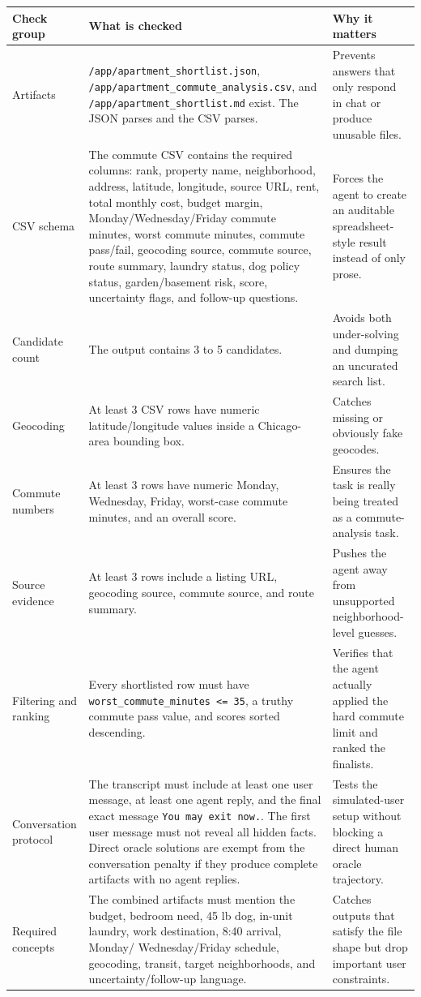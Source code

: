 \documentclass[11pt]{article}
\begin{document}
\begin{center}
\scriptsize
\setlength{\tabcolsep}{4pt}
\begin{tabular}{|>{\raggedright\arraybackslash}p{1.25in}|>{\raggedright\arraybackslash}p{3.1in}|>{\raggedright\arraybackslash}p{1.7in}|}
\hline
Check group & What is checked & Why it matters \\
\hline
Artifacts & \texttt{/app/apartment\_shortlist.json},
\texttt{/app/apartment\_commute\_analysis.csv}, and
\texttt{/app/apartment\_shortlist.md} exist. The JSON parses and the CSV
parses. & Prevents answers that only respond in chat or produce unusable files.
\\
\hline
CSV schema & The commute CSV contains the required columns: rank, property
name, neighborhood, address, latitude, longitude, source URL, rent, total
monthly cost, budget margin, Monday/Wednesday/Friday commute minutes, worst
commute minutes, commute pass/fail, geocoding source, commute source, route
summary, laundry status, dog policy status, garden/basement risk, score,
uncertainty flags, and follow-up questions. & Forces the agent to create an
auditable spreadsheet-style result instead of only prose. \\
\hline
Candidate count & The output contains 3 to 5 candidates. & Avoids both
under-solving and dumping an uncurated search list. \\
\hline
Geocoding & At least 3 CSV rows have numeric latitude/longitude values inside a
Chicago-area bounding box. & Catches missing or obviously fake geocodes. \\
\hline
Commute numbers & At least 3 rows have numeric Monday, Wednesday, Friday,
worst-case commute minutes, and an overall score. & Ensures the task is really
being treated as a commute-analysis task. \\
\hline
Source evidence & At least 3 rows include a listing URL, geocoding source,
commute source, and route summary. & Pushes the agent away from unsupported
neighborhood-level guesses. \\
\hline
Filtering and ranking & Every shortlisted row must have
\texttt{worst\_commute\_minutes <= 35}, a truthy commute pass value, and scores
sorted descending. & Verifies that the agent actually applied the hard commute
limit and ranked the finalists. \\
\hline
Conversation protocol & The transcript must include at least one user message,
at least one agent reply, and the final exact message \texttt{You may exit
now.}. The first user message must not reveal all hidden facts. Direct oracle
solutions are exempt from the conversation penalty if they produce complete
artifacts with no agent replies. & Tests the simulated-user setup without
blocking a direct human oracle trajectory. \\
\hline
Required concepts & The combined artifacts must mention the budget, bedroom
need, 45 lb dog, in-unit laundry, work destination, 8:40 arrival, Monday/
Wednesday/Friday schedule, geocoding, transit, target neighborhoods, and
uncertainty/follow-up language. & Catches outputs that satisfy the file shape
but drop important user constraints. \\
\hline
\end{tabular}
\end{center}
\end{document}
